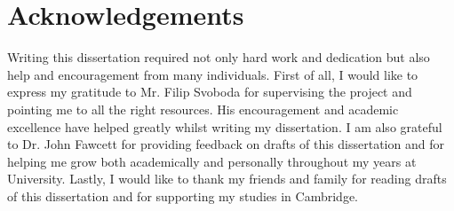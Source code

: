 \documentclass[final,rdr32.tex]{subfiles}
\begin{document}
\clearpage
\section*{Acknowledgements}

Writing this dissertation required not only hard work and dedication but also help and
encouragement from many individuals.
First of all, I would like to express my gratitude to Mr. Filip Svoboda for supervising
the project and pointing me to all the right resources. His encouragement and academic
excellence have helped greatly whilst writing my dissertation.
I am also grateful to Dr. John Fawcett for providing feedback on drafts of this dissertation and for helping me grow both academically and personally throughout my years at University.
Lastly, I would like to thank my friends and family for reading drafts of this
dissertation and for supporting my studies in Cambridge.
\end{document}
